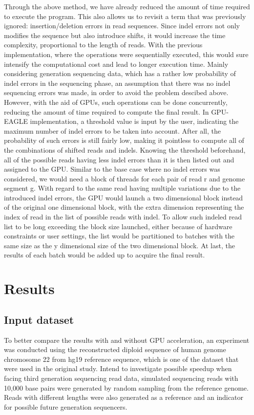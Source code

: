 \documentclass{PHlab-thesis}
\begin{document}
Through the above method, we have already reduced the amount of time required to execute the program. This also allows us to revisit a term that was previously ignored: insertion/deletion errors in read sequences. Since indel errors not only modifies the sequence but also introduce shifts, it would increase the time complexity, proportional to the length of reads. With the previous implementation, where the operations were sequentially executed, this would sure intensify the computational cost and lead to longer execution time. Mainly considering generation sequencing data, which has a rather low probability of indel errors in the sequencing phase, an assumption that there was no indel sequencing errors was made, in order to avoid the problem descibed above. However, with the aid of GPUs, such operations can be done concurrently, reducing the amount of time required to compute the final result. In GPU-EAGLE implementation, a threshold value is input by the user, indicating the maximum number of indel errors to be taken into account. After all, the probability of such errors is still fairly low, making it pointless to compute all of the combinations of shifted reads and indels. Knowing the threshold beforehand, all of the possible reads having less indel errors than it is then listed out and assigned to the GPU. Similar to the base case where no indel errors was considered, we would need a block of threads for each pair of read r and genome segment g. With regard to the same read having multiple variations due to the introduced indel errors, the GPU would launch a two dimensional block instead of the original one dimensional block, with the extra dimension representing the index of read in the list of possible reads with indel. To allow such indeled read list to be long exceeding the block size launched, either because of hardware constraints or user settings, the list would be partitioned to batches with the same size as the y dimensional size of the two dimensional block. At last, the results of each batch would be added up to acquire the final result.

\chapter{Results}
\section{Input dataset}
To better compare the results with and without GPU acceleration, an experiment was conducted using the reconstructed diploid sequence of human genome chromosome 22 from hg19 reference sequence, which is one of the dataset that were used in the original study. Intend to investigate possible speedup when facing third generation sequencing read data, simulated sequencing reads with 10,000 base pairs were generated by random sampling from the reference genome. Reads with different lengths were also generated as a reference and an indicator for possible future generation sequencers.
\end{document}

